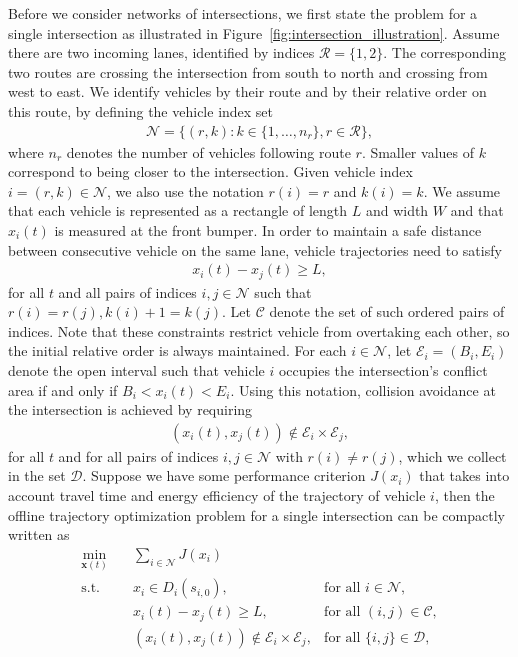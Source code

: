 \documentclass[a4paper]{article}
\theoremstyle{definition}
\theoremstyle{plain}
\begin{document}
Before we consider networks of intersections, we first state the problem for a
single intersection as illustrated in Figure~\ref{fig:intersection_illustration}. Assume there are two incoming
lanes, identified by indices $\mathcal{R} = \{ 1, 2 \}$. The corresponding two
routes are crossing the intersection from south to north and crossing from west
to east. We identify vehicles by their route and by their relative order on this
route, by defining the vehicle index set
\begin{align}
  \mathcal{N} = \{ (r, k) : k \in \{1, \dots, n_{r}\}, r \in \mathcal{R}\} ,
\end{align}
where $n_{r}$ denotes the number of vehicles following route $r$. Smaller
values of $k$ correspond to being closer to the intersection. Given vehicle
index $i = (r, k) \in \mathcal{N}$, we also use the notation $r(i) = r$ and
$k(i) = k$.
%
We assume that each vehicle is represented as a rectangle of length $L$ and
width $W$ and that $x_{i}(t)$ is measured at the front bumper. In order to
maintain a safe distance between consecutive vehicle on the same lane, vehicle
trajectories need to satisfy
\begin{align}
  \label{eq:follow_constraints}
  x_{i}(t) - x_{j}(t) \geq L ,
\end{align}
for all $t$ and all pairs of indices $i, j \in \mathcal{N}$ such that
$r(i) = r(j), k(i) + 1 = k(j)$. Let $\mathcal{C}$ denote the set of such ordered
pairs of indices. Note that these constraints restrict vehicle from overtaking
each other, so the initial relative order is always maintained.
%
For each $i \in \mathcal{N}$, let $\mathcal{E}_{i} = (B_{i}, E_{i})$ denote the
open interval such that vehicle $i$ occupies the intersection's conflict area if
and only if $B_{i} < x_{i}(t) < E_{i}$. Using this notation, collision avoidance
at the intersection is achieved by requiring
\begin{align}
  \label{eq:conflict_constraints}
  (x_{i}(t), x_{j}(t)) \notin \mathcal{E}_{i} \times \mathcal{E}_{j} ,
\end{align}
for all $t$ and for all pairs of indices $i, j \in \mathcal{N}$ with
$r(i) \neq r(j)$, which we collect in the set $\mathcal{D}$.
%
Suppose we have some performance criterion $J(x_{i})$ that takes into account
travel time and energy efficiency of the trajectory of vehicle $i$, then the
offline trajectory optimization problem for a single intersection can be
compactly written as
\begin{subequations}
\label{eq:offline_single_intersection}
\begin{align}
  \min_{\mathbf{x}(t)} \quad & \sum_{i \in \mathcal{N}} J(x_{i}) \\
  \text{s.t.} \quad  & x_{i} \in D_{i}(s_{i,0}) , &\text{for all } i \in \mathcal{N} , \\
                & x_{i}(t) - x_{j}(t) \geq L, &\text{for all } (i,j) \in \mathcal{C} , \\
                & (x_{i}(t), x_{j}(t))  \notin \mathcal{E}_{i} \times \mathcal{E}_{j} , &\text{for all } \{i,j\} \in \mathcal{D} \label{eq:collision_constraints} ,
\end{align}
\end{subequations}
\end{document}
